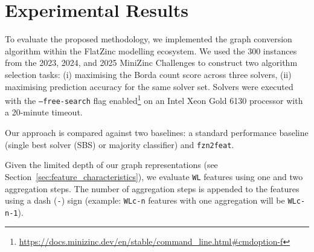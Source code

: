 \section{Experimental Results}

To evaluate the proposed methodology, we implemented the graph conversion algorithm within the FlatZinc modelling ecosystem. We used the 300 instances from the 2023, 2024, and 2025 MiniZinc Challenges to construct two algorithm selection tasks: (i) maximising the Borda count score across three solvers, (ii) maximising prediction accuracy for the same solver set. Solvers were executed with the \texttt{--free-search} flag enabled\footnote{\url{https://docs.minizinc.dev/en/stable/command\_line.html\#cmdoption-f}} on an Intel Xeon Gold 6130 processor with a 20-minute timeout.

Our approach is compared against two baselines: a standard performance baseline (single best solver (SBS) or majority classifier) and \texttt{fzn2feat}.

Given the limited depth of our graph representations (see Section~\ref{sec:feature_characteristics}), we evaluate \texttt{WL} features using one and two aggregation steps. The number of aggregation steps is appended to the features using a dash (\texttt{-}) sign (example: \texttt{WLc-n} features with one aggregation will be \texttt{WLc-n-1}).

